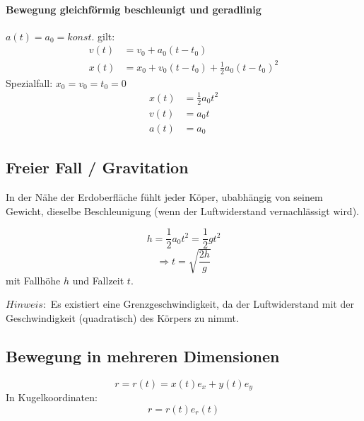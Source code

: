 \documentclass[7pt]{article}
\begin{document}
\begin{multicols*}{3}
\paragraph{Bewegung gleichf{\"o}rmig beschleunigt und geradlinig}\mbox{} 
$a(t) = a_0 = konst.$ gilt: \newline
\begin{equation*}
\begin{split}
		v(t)& = v_0 + a_0(t - t_0)\\
	x(t)& = x_0 + v_0(t - t_0) + \frac{1}{2}a_0(t - t_0)^2
\end{split}
\end{equation*}
\newline
Spezialfall: $x_0 = v_0 = t_0 = 0$ \newline
\begin{equation*}
\begin{split}
	x(t)& = \frac{1}{2}a_0t^2 \\
	v(t)& = a_0t \\
	a(t)& = a_0
\end{split}
\end{equation*}

\subsection{Freier Fall / Gravitation}
In der N{\"a}he der Erdoberfl{\"a}che f{\"u}hlt jeder K{\"o}per, ubabh{\"a}ngig von seinem Gewicht, dieselbe Beschleunigung (wenn der Luftwiderstand vernachl{\"a}ssigt wird).

\begin{equation*}
	h = \frac{1}{2}a_0t^2 = \frac{1}{2}gt^2
\end{equation*}
\begin{equation*}
\Rightarrow t = \sqrt{\frac{2h}{g}}
\end{equation*}
mit Fallh{\"o}he $h$ und Fallzeit $t$.
\newline

$Hinweis:$ Es existiert eine Grenzgeschwindigkeit, da der Luftwiderstand mit der Geschwindigkeit (quadratisch) des K{\"o}rpers zu nimmt.


\subsection{Bewegung in mehreren Dimensionen}
\begin{equation*}
r = r(t) = x(t) e_x + y(t) e_y
\end{equation*}
In Kugelkoordinaten:
\begin{equation*}
r = r(t)e_r(t)
\end{equation*}


\end{multicols*}
\end{document}
